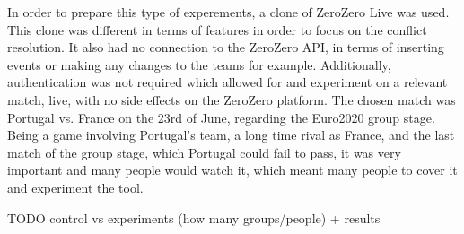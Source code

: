 In order to prepare this type of experements, a clone of ZeroZero Live was used. This clone was different in terms of features in order to focus on the conflict resolution. It also had no connection to the ZeroZero API, in terms of inserting events or making any changes to the teams for example. Additionally, authentication was not required which allowed for and experiment on a relevant match, live, with no side effects on the ZeroZero platform. The chosen match was Portugal vs. France on the 23rd of June, regarding the Euro2020 group stage. Being a game involving Portugal's team, a long time rival as France, and the last match of the group stage, which Portugal could fail to pass, it was very important and many people would watch it, which meant many people to cover it and experiment the tool.

{\Huge TODO control vs experiments (how many groups/people) + results}


